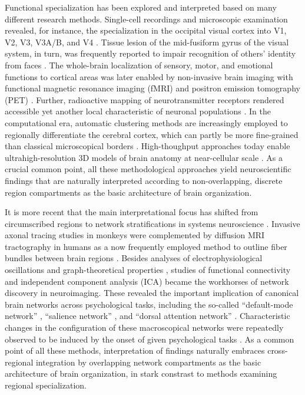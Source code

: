 \documentclass{article} %
\begin{document}
Functional specialization has been
explored and interpreted based on many different research methods.
%
Single-cell recordings and microscopic examination
revealed, for instance, the
specialization in the occipital visual cortex into V1, V2, V3, V3A/B, and V4
\cite{hubel1962receptive, zeki1978functional}.
Tissue lesion of the mid-fusiform gyrus of the visual system,
in turn,
was frequently reported to impair
recognition of others' identity from faces
\cite{iaria2008contrib}.
The whole-brain localization of
sensory, motor, and emotional functions to cortical areas
was later enabled by
non-invasive brain imaging with
functional magnetic resonance imaging (fMRI) and
positron emission tomography (PET)
\cite{fristen1997imaging}.
Further,
radioactive mapping of neurotransmitter receptors
rendered accessible yet another
local characteristic of neuronal populations
\cite{zilles2009receptor}.
In the computational era,
automatic clustering methods are increasingly employed to
regionally differentiate the cerebral cortex,
which can partly be more fine-grained than
classical microscopical borders
\cite{behrens03, cbp2015review}.
High-thoughput approaches today enable
ultrahigh-resolution 3D models of brain anatomy
at near-cellular scale
\cite{amunts2013bigbrain}.
%
As a crucial common point,
all these methodological approaches
yield neuroscientific findings
that are naturally interpreted according to
non-overlapping, discrete region compartments
as the basic architecture of brain organization.



It is more recent
that the main interpretational focus has shifted
from circumscribed regions to network stratifications
in systems neuroscience \cite{yuste2015, stephan_dys}.
%
Invasive axonal tracing studies in monkeys were complemented
by diffusion MRI tractography in humans
as a now frequently employed method to
outline fiber bundles between brain regions
\cite{jbabdi2013long}.
Besides analyses of
electrophysiological oscillations
\cite{buzsaki2004neuronal}
and
graph-theoretical properties \cite{bullmore2009complex},
studies of
functional connectivity \cite{buckner2013opportunities} and
independent component analysis (ICA) \cite{beckmann2005}
became the workhorses of network discovery
in neuroimaging.
These revealed the important implication of
canonical brain networks across psychological tasks,
including the so-called
``default-mode network'' \cite{raichle2001pnas},
``salience network'' \cite{seeley2007dissociable},
and ``dorsal attention network'' \cite{corbettashul2008}. 
Characteristic changes in the configuration of
these macroscopical networks
were repeatedly observed to be induced
by the onset of given psychological tasks \cite{fransson2006}.
%
As a common point of all these methods,
interpretation of findings naturally embraces
cross-regional integration by
overlapping network compartments
as the basic architecture of brain organization,
in stark constrast to methods examining regional specialization.
\end{document}
